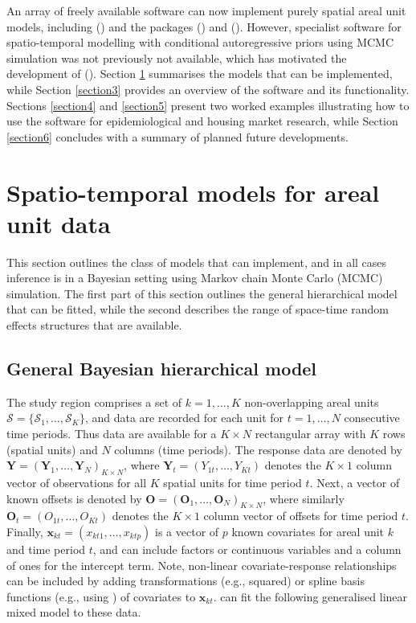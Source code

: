 \documentclass[article, nojss]{jss}
\begin{document}
\hspace{1cm} An array of freely available software can now implement purely spatial areal unit models, including  (\citealp{lunn2009}) and the  packages   (\citealp{lee2013}) and  (\citealp{rue2009}).  However, specialist software for spatio-temporal modelling with conditional autoregressive priors  using MCMC simulation was not previously not available, which has  motivated the development of  (\citealp{lee2018}). Section \ref{section2} summarises the models that can be implemented, while Section \ref{section3} provides an overview of the software and its functionality. Sections \ref{section4} and \ref{section5} present two worked examples illustrating how to use the software for epidemiological and housing market research, while Section \ref{section6} concludes with a summary of planned future developments.



\section{Spatio-temporal models for areal unit data}\label{section2}
This section outlines the class of models that  can implement, and in all cases inference is in a Bayesian setting using Markov chain Monte Carlo (MCMC) simulation. The first part of this section outlines the general hierarchical model that can be fitted, while the second describes the range of space-time random effects structures that are available.


\subsection{General Bayesian hierarchical model}
The study region comprises a set of $k=1,\ldots,K$ non-overlapping areal units $\mathcal{S}=\{\mathcal{S}_{1},\ldots,\mathcal{S}_{K}\}$, and data are recorded for each unit for $t=1,\ldots,N$ consecutive time periods. Thus data are available for a $K\times N$ rectangular array with $K$ rows (spatial units) and $N$ columns (time periods). The response data are denoted by $\mathbf{Y}=(\mathbf{Y}_{1},\ldots,\mathbf{Y}_{N})_{K\times N}$, where $\mathbf{Y}_{t}=(Y_{1t},\ldots,Y_{Kt})$ denotes the $K\times 1$ column vector of observations for all $K$ spatial units for time period $t$. Next, a vector of known offsets is denoted by $\mathbf{O}=(\mathbf{O}_{1},\ldots,\mathbf{O}_{N})_{K\times N}$, where similarly $\mathbf{O}_{t}=(O_{1t},\ldots,O_{Kt})$ denotes the $K\times 1$ column  vector of offsets for time period $t$. Finally, $\mathbf{x}_{kt}=(x_{kt1},\ldots, x_{ktp})$ is a vector of $p$ known covariates for areal unit $k$ and time period $t$, and can include factors or continuous variables and a column of ones for the intercept term. Note, non-linear covariate-response relationships can be included by adding transformations (e.g., squared) or spline basis functions (e.g., using ) of covariates to $\mathbf{x}_{kt}$.  can fit the following generalised linear mixed model to these data.
\end{document}
